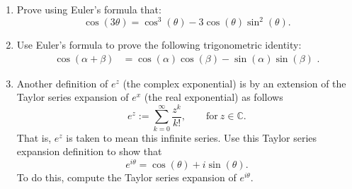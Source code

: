 \begin{enumerate}
\item Prove using Euler's formula that:
\begin{equation*}
    \cos(3\theta )= \cos^3(\theta)-3\cos(\theta)\sin^2(\theta).
\end{equation*}

\item Use Euler's formula to prove the following trigonometric identity:
\begin{align*}
\cos(\alpha + \beta)&=\cos(\alpha)\cos(\beta) - \sin(\alpha)\sin(\beta)\,\,.
\end{align*}

\item Another definition of $e^{z}$ (the complex exponential) is by an extension of the Taylor series expansion of $e^{x}$ (the real exponential) as follows
$$e^{z}:=\sum_{k=0}^{\infty}\frac{z^{k}}{k!}, \quad\quad \text{for}\ z\in\mathbb{C}.$$
That is, $e^{z}$ is taken to mean this infinite series. Use this Taylor series expansion definition to show that
\begin{equation}
  e^{i\theta} = \cos(\theta) + i\sin(\theta).
  \label{ch03:euler_formula}
\end{equation}
To do this, compute the Taylor series expansion of $e^{i\theta}$. 

\end{enumerate}